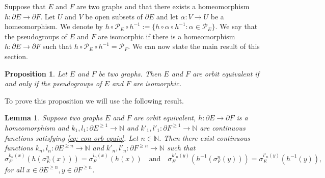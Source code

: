 \documentclass[12pt, a4paper]{amsart}
\numberwithin{equation}{section}
\newtheorem{lemma}[thm]{Lemma}
\newtheorem{prop}[thm]{Proposition}
\theoremstyle{definition}
\theoremstyle{remark}
\begin{document}
Suppose that $E$ and $F$ are two graphs and that there exists a homeomorphism 
$h:\partial E\to \partial F$. Let $U$ and $V$ be open subsets of $\partial E$ 
and let $\alpha:V\to U$ be a homeomorphism. We denote by 
$h\circ\mathcal{P}_E\circ h^{-1}:=\{h\circ\alpha\circ h^{-1}: 
\alpha\in\mathcal{P}_E\}$. We say that the pseudogroups of $E$ and $F$ are 
isomorphic if there is a homeomorphism $h:\partial E\to \partial F$ such that 
$h\circ\mathcal{P}_E\circ h^{-1}=\mathcal{P}_F$. We can now state the main 
result of this section.

\begin{prop}\label{prop:pseudogroups and orbit equivalence}
Let $E$ and $F$ be two graphs. Then $E$ and $F$ are orbit equivalent if and 
only if the pseudogroups of $E$ and $F$ are isomorphic.
\end{prop}

To prove this proposition we will use the following result.

\begin{lemma}\label{lem:orbit}
	Suppose two graphs $E$ and $F$ are orbit equivalent, $h:\partial E\to 
	\partial F$ is a homeomorphism and $k_1,l_1:\partial E^{\ge 1}\to {\mathbb{N}}$ and 
	$k'_1,l'_1:\partial F^{\ge 1}\to {\mathbb{N}}$ are continuous functions satisfying 
	\eqref{eq: con orb equiv}. Let $n\in{\mathbb{N}}$. Then there exist continuous 
	functions $k_n,l_n:\partial E^{\ge n}\to {\mathbb{N}}$ and $k'_n,l'_n:\partial 
	F^{\ge n}\to {\mathbb{N}}$ such that 
	\begin{equation}\label{eq: con orb equiv ext}
	\sigma_F^{k_n(x)}(h(\sigma_E^n(x)))=\sigma_F^{l_n(x)}(h(x))\quad\text{and}\quad\sigma_E^{k'_n(y)}(h^{-1}(\sigma_F^n(y)))=\sigma_E^{l'_n(y)}(h^{-1}(y)),
	\end{equation}
	for all $x\in\partial E^{\ge n}, y\in \partial F^{\ge n}$.
\end{lemma}
\end{document}
